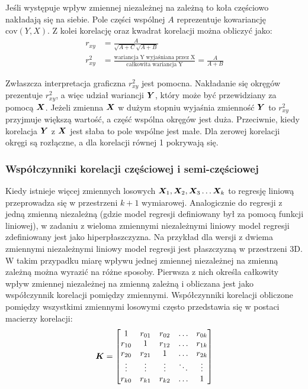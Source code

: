 \begin{appendices}
Jeśli występuje wpływ zmiennej niezależnej na zależną to koła częściowo nakładają się na siebie. Pole części wspólnej $A$ reprezentuje kowariancję $\mathrm{cov}(Y,X)$. Z kolei korelację oraz kwadrat korelacji można obliczyć jako:
\begin{equation}
	\begin{split}
	r_{xy} &= \frac{A}{\sqrt{A+C}\sqrt{A+B}} \\
	r_{xy}^2&= \frac{\mathrm{wariancja\;Y\;wyjaśniana\;przez\;X}}{\mathrm{całkowita\; wariancja\;Y}}=\frac{A}{A+B}
\end{split}
\end{equation}

Zwłaszcza interpretacja graficzna $r_{xy}^2$ jest pomocna. Nakładanie się okręgów prezentuje $r_{xy}^2$, a więc udział wariancji $\bm{Y}$, który może być przewidziany za pomocą $\bm{X}$. Jeżeli zmienna $\bm{X}$ w dużym stopniu wyjaśnia zmienność $\bm{Y}$ to $r_{xy}^2$ przyjmuje większą wartość, a część wspólna okręgów jest duża. Przeciwnie, kiedy korelacja $\bm{Y}$ z $\bm{X}$ jest słaba to pole wspólne jest małe. Dla zerowej korelacji okręgi są rozłączne, a dla korelacji równej 1 pokrywają się.




\subsubsection{Współczynniki korelacji częściowej i semi-częściowej}

Kiedy istnieje więcej zmiennych losowych $\vect{X}_1, \vect{X}_2, \vect{X}_3 \dots \vect{X}_k$ to regresję liniową przeprowadza się w przestrzeni $k+1$ wymiarowej. Analogicznie do regresji z jedną zmienną niezależną (gdzie model regresji definiowany był za pomocą funkcji liniowej), w zadaniu z wieloma zmiennymi niezależnymi liniowy model regresji zdefiniowany jest jako hiperpłaszczyzna. Na przykład dla wersji z dwiema zmiennymi niezależnymi liniowy model regresji jest płaszczyzną w przestrzeni 3D. W takim przypadku miarę wpływu jednej zmiennej niezależnej na zmienną zależną można wyrazić na różne sposoby. Pierwsza z nich określa całkowity wpływ zmiennej niezależnej na zmienną zależną i obliczana jest jako współczynnik korelacji pomiędzy zmiennymi. Współczynniki korelacji obliczone pomiędzy wszystkimi zmiennymi losowymi często przedstawia się w postaci macierzy korelacji:
\begin{equation}
	\bm{K}=\begin{bmatrix}
1      & r_{01} &  r_{02} & \dots & r_{0k} \\
r_{10} & 1 		&  r_{12} & \dots & r_{1k} \\
r_{20} & r_{21}	&  1 	  & \dots & r_{2k} \\
\vdots & \vdots &  \vdots & \ddots & \vdots \\
r_{k0} & r_{k1} & 	r_{k2} & \dots & 1
	\end{bmatrix}
\end{equation}


\end{appendices}
